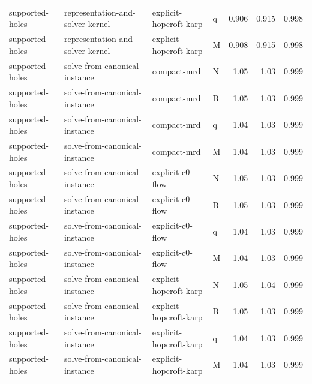 \begin{table}[t]
\begin{tabular}{llllrrr}
supported-holes & representation-and-solver-kernel & explicit-hopcroft-karp & q & 0.906 & 0.915 & 0.998 \\
supported-holes & representation-and-solver-kernel & explicit-hopcroft-karp & M & 0.908 & 0.915 & 0.998 \\
supported-holes & solve-from-canonical-instance & compact-mrd & N & 1.05 & 1.03 & 0.999 \\
supported-holes & solve-from-canonical-instance & compact-mrd & B & 1.05 & 1.03 & 0.999 \\
supported-holes & solve-from-canonical-instance & compact-mrd & q & 1.04 & 1.03 & 0.999 \\
supported-holes & solve-from-canonical-instance & compact-mrd & M & 1.04 & 1.03 & 0.999 \\
supported-holes & solve-from-canonical-instance & explicit-c0-flow & N & 1.05 & 1.03 & 0.999 \\
supported-holes & solve-from-canonical-instance & explicit-c0-flow & B & 1.05 & 1.03 & 0.999 \\
supported-holes & solve-from-canonical-instance & explicit-c0-flow & q & 1.04 & 1.03 & 0.999 \\
supported-holes & solve-from-canonical-instance & explicit-c0-flow & M & 1.04 & 1.03 & 0.999 \\
supported-holes & solve-from-canonical-instance & explicit-hopcroft-karp & N & 1.05 & 1.04 & 0.999 \\
supported-holes & solve-from-canonical-instance & explicit-hopcroft-karp & B & 1.05 & 1.03 & 0.999 \\
supported-holes & solve-from-canonical-instance & explicit-hopcroft-karp & q & 1.04 & 1.03 & 0.999 \\
supported-holes & solve-from-canonical-instance & explicit-hopcroft-karp & M & 1.04 & 1.03 & 0.999 \\
\bottomrule
\end{tabular}
\end{table}

